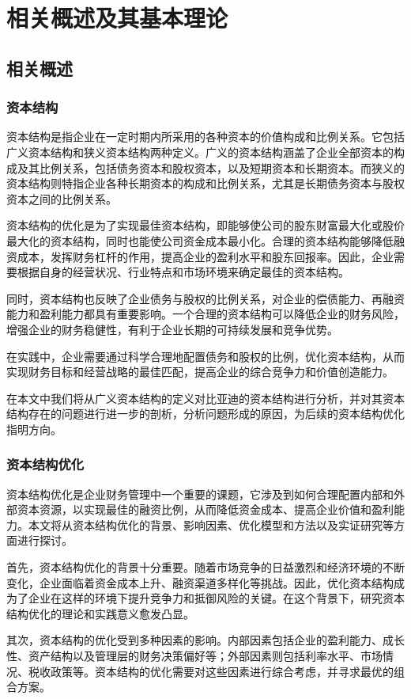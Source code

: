 \chapter{相关概述及其基本理论}
\section{相关概述}
\subsection{资本结构}
资本结构是指企业在一定时期内所采用的各种资本的价值构成和比例关系。它包括广义资本结构和狭义资本结构两种定义。广义的资本结构涵盖了企业全部资本的构成及其比例关系，包括债务资本和股权资本，以及短期资本和长期资本。而狭义的资本结构则特指企业各种长期资本的构成和比例关系，尤其是长期债务资本与股权资本之间的比例关系。

资本结构的优化是为了实现最佳资本结构，即能够使公司的股东财富最大化或股价最大化的资本结构，同时也能使公司资金成本最小化。合理的资本结构能够降低融资成本，发挥财务杠杆的作用，提高企业的盈利水平和股东回报率。因此，企业需要根据自身的经营状况、行业特点和市场环境来确定最佳的资本结构。

同时，资本结构也反映了企业债务与股权的比例关系，对企业的偿债能力、再融资能力和盈利能力都具有重要影响。一个合理的资本结构可以降低企业的财务风险，增强企业的财务稳健性，有利于企业长期的可持续发展和竞争优势。

在实践中，企业需要通过科学合理地配置债务和股权的比例，优化资本结构，从而实现财务目标和经营战略的最佳匹配，提高企业的综合竞争力和价值创造能力。

在本文中我们将从广义资本结构的定义对比亚迪的资本结构进行分析，并对其资本结构存在的问题进行进一步的剖析，分析问题形成的原因，为后续的资本结构优化指明方向。
\subsection{资本结构优化}
资本结构优化是企业财务管理中一个重要的课题，它涉及到如何合理配置内部和外部资本资源，以实现最佳的融资比例，从而降低资金成本、提高企业价值和盈利能力。本文将从资本结构优化的背景、影响因素、优化模型和方法以及实证研究等方面进行探讨。

首先，资本结构优化的背景十分重要。随着市场竞争的日益激烈和经济环境的不断变化，企业面临着资金成本上升、融资渠道多样化等挑战。因此，优化资本结构成为了企业在这样的环境下提升竞争力和抵御风险的关键。在这个背景下，研究资本结构优化的理论和实践意义愈发凸显。

其次，资本结构的优化受到多种因素的影响。内部因素包括企业的盈利能力、成长性、资产结构以及管理层的财务决策偏好等；外部因素则包括利率水平、市场情况、税收政策等。资本结构的优化需要对这些因素进行综合考虑，并寻求最优的组合方案。\cite{Shen2022}

